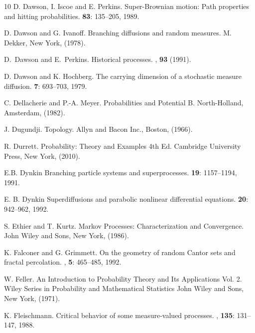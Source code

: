\documentclass[12pt]{article}
\numberwithin{theorem}{section}
\theoremstyle{def}
\numberwithin{equation}{section}
\begin{document}
\begin{thebibliography}{10}
D. Dawson, I. Iscoe and E. Perkins.
\newblock Super-Brownian motion: Path properties and hitting probabilities.
 {\bf 83}: 135--205, 1989.

D. Dawson and G. Ivanoff.
Branching diffusions and random measures.
\newblock M. Dekker, New York, (1978).

D.~Dawson and E.~Perkins.
\newblock Historical processes.
, {\bf 93} (1991).

D. Dawson and K. Hochberg.
\newblock The carrying dimension of a stochastic measure diffusion.
 {\bf 7}: 693--703, 1979.

C. Dellacherie and P.-A. Meyer.
\newblock Probabilities and Potential B.
\newblock North-Holland, Amsterdam, (1982).

J. Dugundji.
\newblock Topology.
\newblock Allyn and Bacon Inc., Boston, (1966).

R. Durrett.
\newblock Probability: Theory and Examples 4th Ed.
\newblock Cambridge University Press, New York, (2010).

E.B. Dynkin
\newblock Branching particle systems and superprocesses.
 {\bf 19}: 1157--1194, 1991.

E. B. Dynkin
\newblock Superdiffusions and parabolic nonlinear differential equations.
 {\bf 20}: 942--962, 1992.

S. Ethier and T. Kurtz.
\newblock Markov Processes: Characterization and Convergence.
\newblock John Wiley and Sons, New York, (1986).

K. Falconer and G. Grimmett.
\newblock On the geometry of random Cantor sets and fractal percolation.
, {\bf 5}: 465--485, 1992.

W. Feller.
\newblock An Introduction to Probability Theory and Its Applications Vol. 2.
\newblock Wiley Series in Probability and Mathematical Statistics
\newblock John Wiley and Sons, New York, (1971).

K. Fleischmann.
\newblock Critical behavior of some measure-valued processes. 
, {\bf 135}: 131--147, 1988.


\end{thebibliography}
\end{document}
